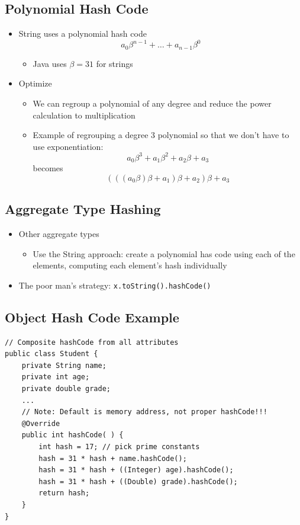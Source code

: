\documentclass[10pt]{article}
\begin{document}
\subsection*{Polynomial Hash Code}
\begin{itemize}
    \item String uses a polynomial hash code
    $$ a_0 \beta^{n-1} + \dots + a_{n-1} \beta^0$$
    \begin{itemize}
        \item Java uses $\beta=31$ for strings
    \end{itemize}
    \item Optimize
    \begin{itemize}
        \item We can regroup a polynomial of any degree and reduce the power calculation to multiplication
        \item Example of regrouping a degree 3 polynomial so that we don't have to use exponentiation:
        $$ a_0 \beta^{3} + a_1 \beta^2 + a_2 \beta + a_3$$
        becomes
        $$(((a_0 \beta)\beta + a_1)\beta + a_2)\beta + a_3$$
    \end{itemize}
\end{itemize}

\subsection*{Aggregate Type Hashing}
\begin{itemize}
    \item Other aggregate types
    \begin{itemize}
        \item Use the String approach: create a polynomial has code using each of the elements, computing each element's hash individually
    \end{itemize}
    \item The poor man's strategy: \texttt{x.toString().hashCode()}
\end{itemize}

\subsection*{Object Hash Code Example}
\begin{verbatim}
// Composite hashCode from all attributes
public class Student {
    private String name;
    private int age;
    private double grade;
    ...
    // Note: Default is memory address, not proper hashCode!!!
    @Override
    public int hashCode( ) {
        int hash = 17; // pick prime constants
        hash = 31 * hash + name.hashCode();
        hash = 31 * hash + ((Integer) age).hashCode();
        hash = 31 * hash + ((Double) grade).hashCode();
        return hash;
    } 
} 
\end{verbatim}
\end{document}
